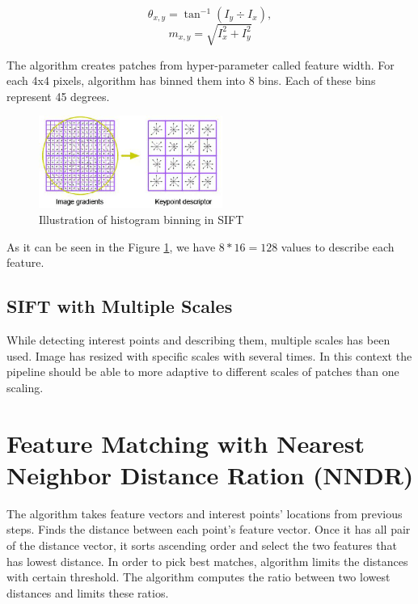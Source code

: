 \documentclass[a4paper]{article}
\begin{document}
\begin{equation}
    \theta_{x,y} = \tan^{-1}(I_y \div I_x),
\end{equation}
\begin{equation}
    m_{x,y} = \sqrt{I_x^2 + I_y^2}
\end{equation}

The algorithm creates patches from hyper-parameter called feature width. For each 4x4 pixels, algorithm has binned them into 8 bins. Each of these bins represent 45 degrees.

\begin{figure}[!htbp]
\begin{center}
\includegraphics[width=6cm]{The-SIFT-descriptor-generation-2.png}
\end{center}
\caption{Illustration of histogram binning in SIFT \cite{sift}}
\label{sift_example}
\end{figure}

As it can be seen in the Figure \ref{sift_example}, we have $8*16=128$ values to describe each feature.



\subsection{SIFT with Multiple Scales}

While detecting interest points and describing them, multiple scales has been used. Image has resized with specific scales with several times. In this context the pipeline should be able to more adaptive to different scales of patches than one scaling. 

\section{Feature Matching with Nearest Neighbor Distance Ration (NNDR)}

The algorithm takes feature vectors and interest points' locations from previous steps. Finds the distance between each point's feature vector. Once it has all pair of the distance vector, it sorts ascending order and select the two features that has lowest distance. In order to pick best matches, algorithm limits the distances with certain threshold. The algorithm computes the ratio between two lowest distances and limits these ratios.
\end{document}

